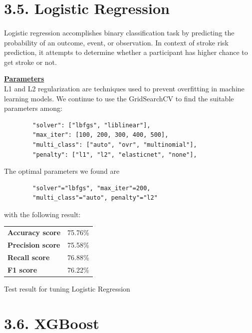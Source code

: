 \documentclass[a4paper]{report}
\begin{document}
	\section*{\Large 3.5. Logistic Regression}
	\Large
	\paragraph{}
	Logistic regression accomplishes binary classification task by predicting the probability of an outcome, event, or observation. In context of stroke risk prediction, it attempts to determine whether a participant has higher chance to get stroke or not.
	
	\underline{\textbf{\Large Parameters}}\\
	
	L1 and L2 regularization are techniques used to prevent overfitting in machine learning models. We continue to use the GridSearchCV to find the suitable parameters among:
	\begin{verbatim}
		"solver": ["lbfgs", "liblinear"],
		"max_iter": [100, 200, 300, 400, 500], 
		"multi_class": ["auto", "ovr", "multinomial"], 
		"penalty": ["l1", "l2", "elasticnet", "none"],
	\end{verbatim} 
	The optimal parameters we found are 
	\begin{verbatim}
		"solver"="lbfgs", "max_iter"=200, 
		"multi_class"="auto", penalty"="l2"
	\end{verbatim}
	with the following result:
	\begin{center}
		\begin{tabular}{ll}
			\toprule
			\textbf{Accuracy score} & 75.76\% \\
			\textbf{Precision score} & 75.58\%\\
			\textbf{Recall score} & 76.88\% \\
			\textbf{F1 score } & 76.22\%\\
			\bottomrule
		\end{tabular}
	\end{center}
	\begin{center}
		Test result for tuning Logistic Regression
	\end{center}
	
	\section*{\Large 3.6. XGBoost}
	
\end{document}
